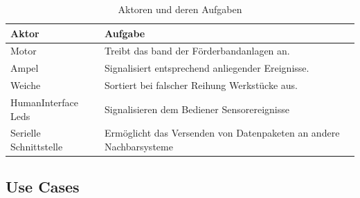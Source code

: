 \documentclass[a4paper, 11pt]{article}
\begin{document}
\begin{table}[h]
\center
\begin{tabularx}{\textwidth}{|l|X|}
\hline
\textbf{Aktor}&\textbf{Aufgabe}\\
\hline
Motor&Treibt das band der Förderbandanlagen an.\\
\hline
Ampel&Signalisiert entsprechend anliegender Ereignisse.\\
\hline
Weiche&Sortiert bei falscher Reihung Werkstücke aus.\\
\hline
HumanInterface Leds&Signalisieren dem Bediener Sensorereignisse\\
\hline
Serielle Schnittstelle&Ermöglicht das Versenden von Datenpaketen an andere Nachbarsysteme\\
\hline
\end{tabularx}
\caption{Aktoren und deren Aufgaben}
\label{acttasks}
\end{table}

\newpage

\subsection{Use Cases}
\end{document}
